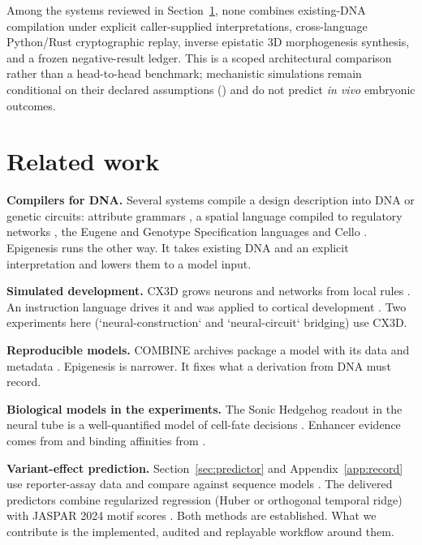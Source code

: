 \documentclass[10.5pt,a4paper]{article}
\begin{document}
Among the systems reviewed in Section~\ref{sec:related}, none combines existing-DNA compilation under explicit caller-supplied interpretations, cross-language Python/Rust cryptographic replay, inverse epistatic 3D morphogenesis synthesis, and a frozen negative-result ledger. This is a scoped architectural comparison rather than a head-to-head benchmark; mechanistic simulations remain conditional on their declared assumptions () and do not predict \emph{in vivo} embryonic outcomes.

\section{Related work}\label{sec:related}

\textbf{Compilers for DNA.} Several systems compile a design description into DNA or genetic circuits: attribute grammars \citep{cai2009}, a spatial language compiled to regulatory networks \citep{beal2011}, the Eugene and Genotype Specification languages \citep{bilitchenko2011,wilson2016} and Cello \citep{nielsen2016}. Epigenesis runs the other way. It takes existing DNA and an explicit interpretation and lowers them to a model input.

\textbf{Simulated development.} CX3D grows neurons and networks from local rules \citep{zubler2009}. An instruction language drives it \citep{zubler2011} and was applied to cortical development \citep{zubler2013}. Two experiments here (`neural-construction` and `neural-circuit` bridging) use CX3D.

\textbf{Reproducible models.} COMBINE archives package a model with its data and metadata \citep{bergmann2014}. Epigenesis is narrower. It fixes what a derivation from DNA must record.

\textbf{Biological models in the experiments.} The Sonic Hedgehog readout in the neural tube is a well-quantified model of cell-fate decisions \citep{balaskas2012,cohen2014,herreradelgado2020}. Enhancer evidence comes from \citet{peterson2012} and binding affinities from \citet{hallikas2006}.

\textbf{Variant-effect prediction.} Section~\ref{sec:predictor} and Appendix~\ref{app:record} use reporter-assay data \citep{melnikov2012,tewhey2016,kircher2019,kreimer2022} and compare against sequence models \citep{zhou2015,kelley2016,kelley2018,avsec2021,chen2022}. The delivered predictors combine regularized regression (Huber \citealt{huber1964} or orthogonal temporal ridge) with JASPAR 2024 motif scores \citep{rauluseviciute2024}. Both methods are established. What we contribute is the implemented, audited and replayable workflow around them.
\end{document}
